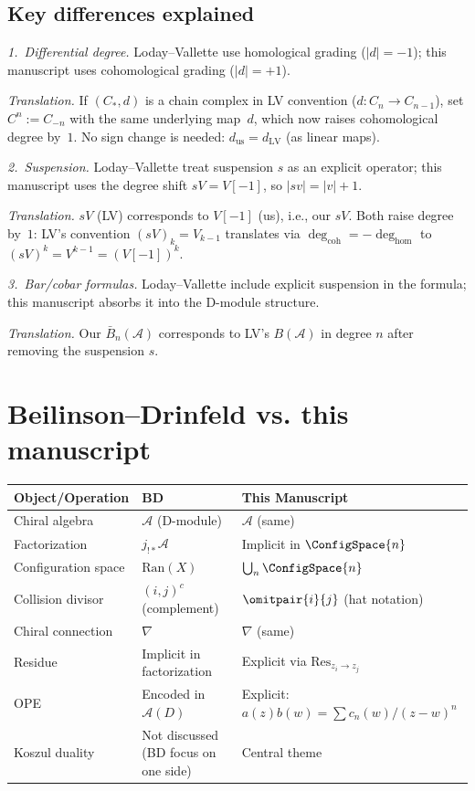 \subsection{Key differences explained}

\emph{1.~Differential degree.}
Loday--Vallette use homological grading ($|d| = -1$); this manuscript uses cohomological grading ($|d| = +1$).

\emph{Translation.} If $(C_*, d)$ is a chain complex in LV convention ($d: C_n \to C_{n-1}$), set $C^n := C_{-n}$ with the same underlying map~$d$, which now raises cohomological degree by~$1$.  No sign change is needed: $d_{\text{us}} = d_{\text{LV}}$ (as linear maps).

\emph{2.~Suspension.}
Loday--Vallette treat suspension $s$ as an explicit operator; this manuscript uses the degree shift $sV = V[-1]$, so $|sv| = |v| + 1$.

\emph{Translation.} $sV$ (LV) corresponds to $V[-1]$ (us), i.e., our $sV$.  Both raise degree by~$1$: LV's convention $(sV)_k = V_{k-1}$ translates via $\deg_{\mathrm{coh}} = -\deg_{\mathrm{hom}}$ to $(sV)^k = V^{k-1} = (V[-1])^k$.

\emph{3.~Bar/cobar formulas.}
Loday--Vallette include explicit suspension in the formula; this manuscript absorbs it into the D-module structure.

\emph{Translation.} Our $\bar{B}_n(\mathcal{A})$ corresponds to LV's $B(\mathcal{A})$ in degree $n$ after removing the suspension $s$.

\section{Beilinson--Drinfeld vs. this manuscript}

\begin{center}
\begin{tabular}{|>{\raggedright\arraybackslash}p{5.8cm}|>{\raggedright\arraybackslash}p{3.9cm}|>{\raggedright\arraybackslash}p{3.9cm}|}
\hline
\textbf{Object/Operation} & \textbf{BD \cite{BD04}} & \textbf{This Manuscript} \\
\hline
Chiral algebra & $\mathcal{A}$ (D-module) & $\mathcal{A}$ (same) \\
Factorization & $j_{!*}\mathcal{A}$ & Implicit in $\ConfigSpace{n}$ \\
Configuration space & $\text{Ran}(X)$ & $\bigcup_n \ConfigSpace{n}$ \\
Collision divisor & $(i,j)^c$ (complement) & $\omitpair{i}{j}$ (hat notation) \\
Chiral connection & $\nabla$ & $\nabla$ (same) \\
Residue & Implicit in factorization & Explicit via $\text{Res}_{z_i \to z_j}$ \\
OPE & Encoded in $\mathcal{A}(D)$ & Explicit: $a(z)b(w) = \sum c_n(w)/(z-w)^n$ \\
Koszul duality & Not discussed (BD focus on one side) & Central theme \\
\hline
\end{tabular}
\end{center}

